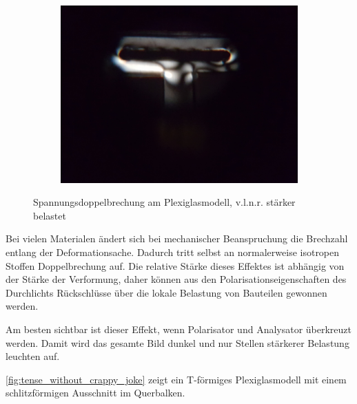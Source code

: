 \begin{figure}[tb]
\begin{subfigure}{.3\textwidth}
		\label{subfig:tenseb}
	\end{subfigure}
	$\quad$
	\begin{subfigure}{.3\textwidth}
		\centering
		\includegraphics[height=.8\linewidth]{./img/tense2.jpg}
		\label{subfig:tensec}
	\end{subfigure}
	\caption[Spannungsdoppelbrechung am Plexiglasmodell]{Spannungsdoppelbrechung am Plexiglasmodell, v.l.n.r. stärker belastet}
	\label{fig:tense_without_crappy_joke}
\end{figure}

Bei vielen Materialen ändert sich bei mechanischer Beanspruchung die Brechzahl entlang der Deformationsache.
Dadurch tritt selbst an normalerweise isotropen Stoffen Doppelbrechung auf.
Die relative Stärke dieses Effektes ist abhängig von der Stärke der Verformung, daher können aus den Polarisationseigenschaften des Durchlichts Rückschlüsse über die lokale Belastung von Bauteilen gewonnen werden.

Am besten sichtbar ist dieser Effekt, wenn Polarisator und Analysator überkreuzt werden. Damit wird das gesamte Bild dunkel und nur Stellen stärkerer Belastung leuchten auf.

\autoref{fig:tense_without_crappy_joke} zeigt ein T-förmiges Plexiglasmodell mit einem schlitzförmigen Ausschnitt im Querbalken.